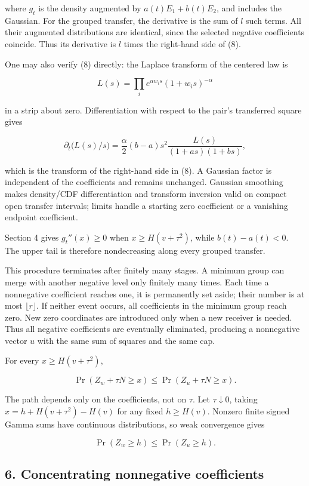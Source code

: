 \documentclass[10pt,a4paper]{article}
\begin{document}
where \(g_t\) is the density augmented by \(a(t)E_1+b(t)E_2\), and
includes the Gaussian. For the grouped transfer, the derivative is the
sum of \(l\) such terms. All their augmented distributions are
identical, since the selected negative coefficients coincide. Thus its
derivative is \(l\) times the right-hand side of (8).

One may also verify (8) directly: the Laplace transform of the centered
law is

\[
L(s)=\prod_i e^{\alpha w_i s}(1+w_i s)^{-\alpha}
\]

in a strip about zero. Differentiation with respect to the pair's
transferred square gives

\[
\partial_t\bigl(L(s)/s\bigr)
=\frac\alpha2(b-a)s^2\frac{L(s)}{(1+as)(1+bs)},
\]

which is the transform of the right-hand side in (8). A Gaussian factor
is independent of the coefficients and remains unchanged. Gaussian
smoothing makes density/CDF differentiation and transform inversion
valid on compact open transfer intervals; limits handle a starting zero
coefficient or a vanishing endpoint coefficient.

Section 4 gives \(g_t''(x)\ge0\) when \(x\ge H(v+\tau^2)\), while
\(b(t)-a(t)<0\). The upper tail is therefore nondecreasing along every
grouped transfer.

This procedure terminates after finitely many stages. A minimum group
can merge with another negative level only finitely many times. Each
time a nonnegative coefficient reaches one, it is permanently set aside;
their number is at most \(\lfloor r\rfloor\). If neither event occurs,
all coefficients in the minimum group reach zero. New zero coordinates
are introduced only when a new receiver is needed. Thus all negative
coefficients are eventually eliminated, producing a nonnegative vector
\(u\) with the same sum of squares and the same cap.

For every \(x\ge H(v+\tau^2)\),

\[
\Pr(Z_w+\tau N\ge x)\le\Pr(Z_u+\tau N\ge x).
\]

The path depends only on the coefficients, not on \(\tau\). Let
\(\tau\downarrow0\), taking \(x=h+H(v+\tau^2)-H(v)\) for any fixed
\(h\ge H(v)\). Nonzero finite signed Gamma sums have continuous
distributions, so weak convergence gives

\[
\Pr(Z_w\ge h)\le\Pr(Z_u\ge h).                    \tag{9}
\]

\subsection{6. Concentrating nonnegative
coefficients}\label{concentrating-nonnegative-coefficients}
\end{document}
